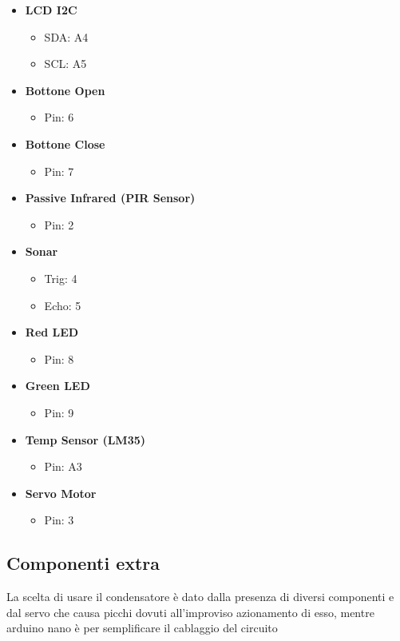 \documentclass[a4paper,12pt]{report}
\begin{document}
\begin{itemize}
    \item \textbf{LCD I2C}
    \begin{itemize}
        \item SDA: A4
        \item SCL: A5
    \end{itemize}
    \item \textbf{Bottone Open}
    \begin{itemize}
        \item Pin: 6
    \end{itemize}
    \item \textbf{Bottone Close}
    \begin{itemize}
        \item Pin: 7
    \end{itemize}
    \item \textbf{Passive Infrared (PIR Sensor)}
    \begin{itemize}
        \item Pin: 2
    \end{itemize}
    \item \textbf{Sonar}
    \begin{itemize}
        \item Trig: 4
        \item Echo: 5
    \end{itemize}
    \item \textbf{Red LED}
    \begin{itemize}
        \item Pin: 8
    \end{itemize}
    \item \textbf{Green LED}
    \begin{itemize}
        \item Pin: 9
    \end{itemize}
    \item \textbf{Temp Sensor (LM35)}
    \begin{itemize}
        \item Pin: A3
    \end{itemize}
    \item \textbf{Servo Motor}
    \begin{itemize}
        \item Pin: 3
    \end{itemize}
\end{itemize}
\subsection{Componenti extra}
La scelta di usare il condensatore è dato dalla presenza di 
diversi componenti e dal servo che causa picchi dovuti all'improviso
azionamento di esso, mentre arduino nano è per semplificare il cablaggio del circuito
\end{document}
